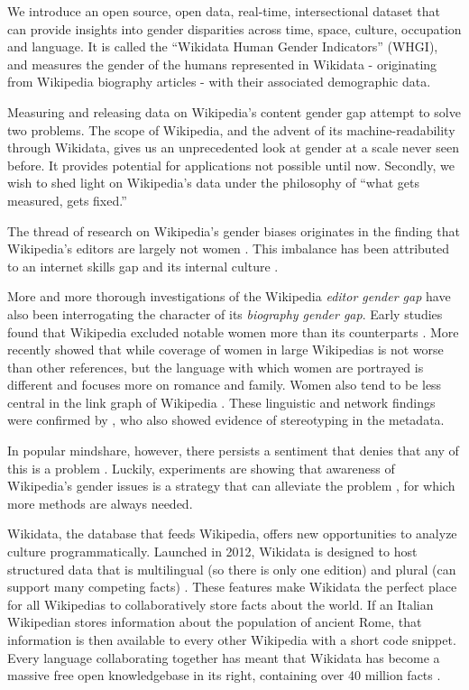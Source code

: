 \documentclass[letterpaper]{article}
\begin{document}
We introduce an open source, open data, real-time, intersectional dataset that can provide insights into gender disparities across time, space, culture, occupation and language. It is called the ``Wikidata Human Gender Indicators'' (WHGI), and measures the gender of the humans represented in Wikidata - originating from Wikipedia biography articles - with their associated demographic data.

Measuring and releasing data on Wikipedia's content gender gap attempt to solve two problems. The scope of Wikipedia, and the advent of its machine-readability through Wikidata, gives us an unprecedented look at gender at a scale never seen before. It provides potential for applications not possible until now. Secondly, we wish to shed light on Wikipedia's data under the philosophy of ``what gets measured, gets fixed.''

The thread of research on Wikipedia's gender biases originates in the finding that Wikipedia's editors are largely not women \cite{hill_wikipedia_2013}. This imbalance has been attributed to an internet skills gap \cite{hargittai_mind_2015} and its internal culture \cite{lam_wp:clubhouse?:_2011}.

More and more thorough investigations of the Wikipedia \textit{editor gender gap} have also been interrogating the character of its \textit{biography gender gap}. Early studies found that Wikipedia excluded notable women more than its counterparts \cite{reagle_gender_2011}. More recently \cite{wagner_its_2015} showed that while coverage of women in large Wikipedias is not worse than other references, but the language with which women are portrayed is different and focuses more on romance and family. Women also tend to be less central in the link graph of Wikipedia \cite{10.1371/journal.pone.0114825}. These linguistic and network findings were confirmed by \cite{graells-garrido_first_2015}, who also showed evidence of stereotyping in the metadata.

In popular mindshare, however, there persists a sentiment that denies that any of this is a problem \cite{eckert_retriggering_2013}. Luckily, experiments are showing that awareness of Wikipedia's gender issues is a strategy that can alleviate the problem \cite{hinnosaar_gender_2015}, for which more methods are always needed.

Wikidata, the database that feeds Wikipedia, offers new opportunities to analyze culture programmatically. Launched in 2012, Wikidata is designed to host structured data that is multilingual (so there is only one edition) and plural (can support many competing facts) \cite{vrandecic_wikidata:_2014}.  These features make Wikidata the perfect place for all Wikipedias to collaboratively store facts about the world. If an Italian Wikipedian stores information about the population of ancient Rome, that information is then available to every other Wikipedia with a short code snippet. Every language collaborating together has meant that Wikidata has become a massive free open knowledgebase in its right, containing over 40 million facts \cite{krotzsch_how_????}.
\end{document}
